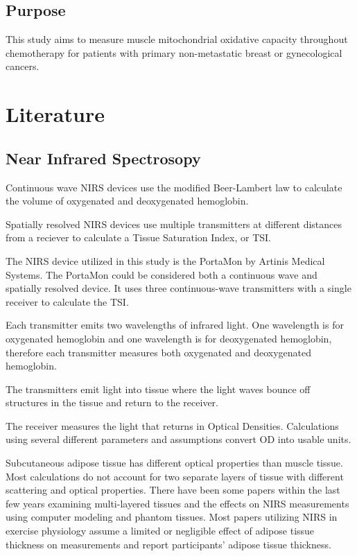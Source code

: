 \documentclass[
]{book}
\begin{document}
\hypertarget{purpose}{%
\section{Purpose}\label{purpose}}

This study aims to measure muscle mitochondrial oxidative capacity throughout chemotherapy for patients with primary non-metastatic breast or gynecological cancers.

\hypertarget{Literature}{%
\chapter{Literature}\label{Literature}}

\hypertarget{Literature-nirs}{%
\section{Near Infrared Spectrosopy}\label{Literature-nirs}}

Continuous wave NIRS devices use the modified Beer-Lambert law to calculate the volume of oxygenated and deoxygenated hemoglobin.

Spatially resolved NIRS devices use multiple transmitters at different distances from a reciever to calculate a Tissue Saturation Index, or TSI.

The NIRS device utilized in this study is the PortaMon by Artinis Medical Systems. The PortaMon could be considered both a continuous wave and spatially resolved device. It uses three continuous-wave transmitters with a single receiver to calculate the TSI.

Each transmitter emits two wavelengths of infrared light. One wavelength is for oxygenated hemoglobin and one wavelength is for deoxygenated hemoglobin, therefore each transmitter measures both oxygenated and deoxygenated hemoglobin.

The transmitters emit light into tissue where the light waves bounce off structures in the tissue and return to the receiver.

The receiver measures the light that returns in Optical Densities. Calculations using several different parameters and assumptions convert OD into usable units.

Subcutaneous adipose tissue has different optical properties than muscle tissue. Most calculations do not account for two separate layers of tissue with different scattering and optical properties. There have been some papers within the last few years examining multi-layered tissues and the effects on NIRS measurements using computer modeling and phantom tissues. Most papers utilizing NIRS in exercise physiology assume a limited or negligible effect of adipose tissue thickness on measurements and report participants' adipose tissue thickness.
\end{document}
